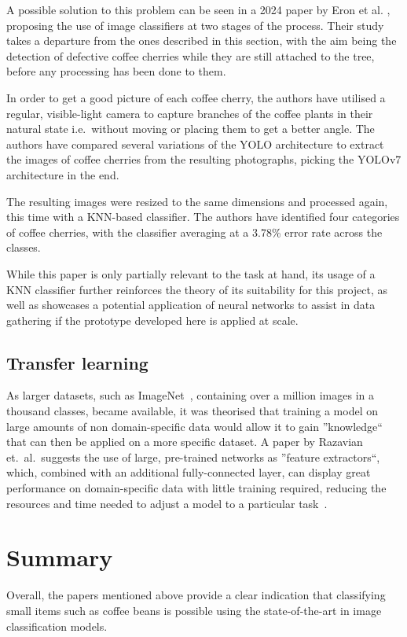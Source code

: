 A possible
solution to this problem can be seen in a 2024 paper by Eron et al.
\cite{eronCoffeeCherryOnTrees}, proposing the use of image classifiers at two stages
of the process.
Their study takes a departure from the ones described in this
section, with the aim being the detection of defective coffee cherries while they
are still attached to the tree, before any processing has been done to them.

In order to get a good picture of each coffee cherry, the authors have utilised a
regular, visible-light camera to capture branches of the coffee plants in their
natural state i.e.\ without moving or placing them to get a better angle.
The
authors have compared several variations of the YOLO architecture to extract the
images of coffee cherries from the resulting photographs, picking the YOLOv7 architecture
in the end.

The resulting images were resized to the same dimensions and processed again,
this time with a KNN-based classifier.
The authors have identified four categories
of coffee cherries, with the classifier averaging at a 3.78\% error rate across the
classes.

While this paper is only partially relevant to the task at hand, its usage of a
KNN classifier further reinforces the theory of its suitability for this project,
as well as showcases a potential application of neural networks to assist in data
gathering if the prototype developed here is applied at scale.

\subsection{Transfer learning}
\label{sec:transfer-learning-litreview}
As larger datasets, such as ImageNet~\cite{imageNet}, containing over a million images in a thousand classes,
became available, it was theorised that training a model on large amounts of non domain-specific data would allow it
to gain ''knowledge`` that can then be applied on a more specific dataset.
A paper by Razavian et.\ al.\ suggests the use of large, pre-trained networks as ''feature extractors``, which,
combined with an additional fully-connected layer, can display great performance on domain-specific data with little training
required, reducing the resources and time needed to adjust a model to a particular task~\cite{transferLearning}.

\section{Summary}
\label{sec:lit-review-summary}
Overall, the papers mentioned above provide a
clear indication that classifying small items such as coffee beans is possible
using the state-of-the-art in image classification models.

